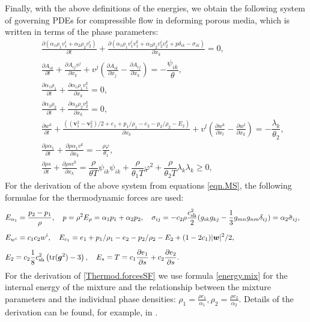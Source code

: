 \documentclass[3p,times,table]{article}
\renewcommand{\ggg}{{\bm{g}}}
\newcommand{\vv}{{\bm{v}}}
\newcommand{\ww}{{\bm{w}}}
\newcommand{\tr}{\textnormal{tr}}
\newcommand{\csh}{c_{\rm sh}}
\begin{document}
Finally, with the above definitions of the energies, we obtain the 
following system of governing PDEs for compressible flow in deforming 
porous media, which is written in terms of the phase parameters:
\begin{subequations}\label{eqn.PV}
	\begin{eqnarray}
&&\displaystyle\frac{\partial 
(\alpha_1\rho_1v^i_1+\alpha_2\rho_2v^i_2)}{\partial t}+
\frac{\partial(\alpha_1\rho_1v^i_1v^k_1+\alpha_2\rho_2v^i_2v^k_2 
+p\delta_{ik}-\sigma_{ik})}{\partial x_k}=0, 
\label{eqn.momentumPV}\\[2mm]
&&\displaystyle\frac{\partial A_{i k}}{\partial t}+\frac{\partial A_{ij} 
	v^j}{\partial x_k}+v^j\left(\frac{\partial A_{ik}}{\partial 
	x_j}-\frac{\partial A_{ij}}{\partial x_k}\right)
=-\dfrac{ \psi_{ik} }{\theta},\label{eqn.deformationPV}\\[2mm]
&& \frac{\partial \alpha_1\rho_1}{\partial t}+\frac{\partial \alpha_1\rho_1 
v^k_1}{\partial 
	x_k}=0,\label{eqn.contiPV1}\\[2mm]
&& \frac{\partial \alpha_2\rho_2}{\partial t}+\frac{\partial \alpha_2\rho_2 
v^k_2}{\partial 
	x_k}=0,\label{eqn.contiPV2}\\[2mm]
&&\displaystyle\frac{\partial w^k}{\partial 
t}+\frac{((\vv_1^2-\vv_2^2)/2+e_1+p_1/\rho_1-e_2-p_2/\rho_2-E_2)}{\partial 
x_k}
+v^l\left(\frac{\partial w^k}{\partial x_l}-
\frac{\partial w^l}{\partial x_k}\right)
=-\dfrac{ \lambda_{k}
}{\theta_2}, \label{eqn.relvelPV}\\[2mm]
&& \frac{\partial \rho \alpha_1}{\partial t}+\frac{\partial \rho \alpha_1 v^k 
}{\partial 
	x_k}=-\frac{\rho \varphi}{\theta_1},\label{eqn.alphaPV}\\[2mm]
&&\displaystyle\frac{\partial \rho s}{\partial t}+\frac{\partial \rho 
	s v^k }{\partial x_k}=\dfrac{\rho}{\theta T}\psi_{ik} \psi_{ik}+
\dfrac{\rho}{\theta_1 T}\varphi^2 +
\dfrac{\rho}{\theta_2 T}\lambda_k \lambda_k \geq0, 
\label{eqn.entropyPV}
\end{eqnarray}
\end{subequations}
For the derivation of the above system from equations \eqref{eqn.MS}, the following 
formulae for the thermodynamic forces are used:
\begin{eqnarray} \label{Thermod.forcesSF}
& E_{\alpha_1}=\frac{p_2-p_1}{\rho}, \quad p=\rho^2E_\rho={\alpha_1p_1+\alpha_2p_2}, 
\quad \sigma_{ij}=-c_2 \rho 
\frac{\csh^2}{2}({g_{ik}g_{kj}-\frac{1}{3}g_{mn}g_{nm}\delta_{ij}})=
\alpha_2 \tilde \sigma_{ij}, 
\quad  \nonumber \\[2mm]
&E_{w^i}=c_1c_2 w^i, \quad 
E_{c_1}=e_1+p_1/\rho_1-e_2-p_2/\rho_2-E_2+(1-2c_1)|\ww|^2/2, \\[2mm]
&E_2=c_2 \frac{1}{8}\csh^2\left(\tr({\ggg^2})-3\right), \quad 
E_s=T=c_1\frac{\partial e_1}{\partial s}+c_2\frac{\partial e_2}{\partial s}.
\nonumber
\end{eqnarray}  
For the derivation of \eqref{Thermod.forcesSF} we use formula \eqref{energy.mix} for the internal energy of the mixture and the relationship between the mixture parameters and the individual phase densities: $\rho_1=\frac{\rho c_1}{\alpha_1}, \rho_2=\frac{\rho c_2}{\alpha_2}$.
Details of the derivation can be found, for example, in 
\cite{RomDrikToro2010,Romenski2016}. 
 
\end{document}
